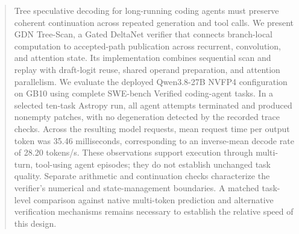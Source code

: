 \begin{abstract}
Tree speculative decoding for long-running coding agents must preserve coherent continuation across repeated generation and tool calls. We present GDN Tree-Scan, a Gated DeltaNet verifier that connects branch-local computation to accepted-path publication across recurrent, convolution, and attention state. Its implementation combines sequential scan and replay with draft-logit reuse, shared operand preparation, and attention parallelism. We evaluate the deployed Qwen3.8-27B NVFP4 configuration on GB10 using complete SWE-bench Verified coding-agent tasks. In a selected ten-task Astropy run, all agent attempts terminated and produced nonempty patches, with no degeneration detected by the recorded trace checks. Across the resulting model requests, mean request time per output token was 35.46 milliseconds, corresponding to an inverse-mean decode rate of 28.20 tokens/s. These observations support execution through multi-turn, tool-using agent episodes; they do not establish unchanged task quality. Separate arithmetic and continuation checks characterize the verifier's numerical and state-management boundaries. A matched task-level comparison against native multi-token prediction and alternative verification mechanisms remains necessary to establish the relative speed of this design.
\end{abstract}
